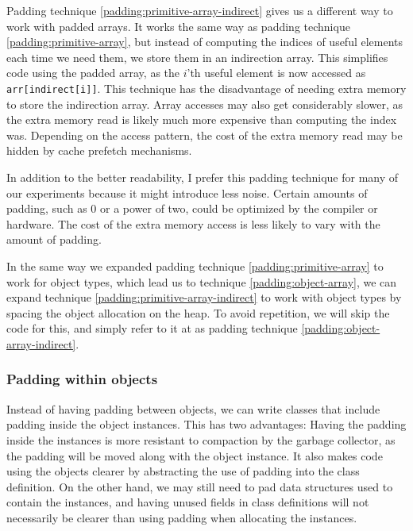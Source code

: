 Padding technique \ref{padding:primitive-array-indirect} gives us a different way to
work with padded arrays. It works the same way as padding technique
\ref{padding:primitive-array}, but instead of computing the indices of
useful elements each time we need them, we store them in an indirection array.
This simplifies code using the padded array, as the $i$'th
useful element is now accessed as \verb|arr[indirect[i]]|. This technique has the
disadvantage of needing extra memory to store the indirection array. Array
accesses may also get considerably slower, as the extra memory read is likely
much more expensive than computing the index was. Depending on the access
pattern, the cost of the extra memory read may be hidden by cache prefetch
mechanisms.

In addition to the better readability, I prefer this padding technique for many
of our experiments because it might introduce less noise. Certain amounts of
padding, such as 0 or a power of two, could be optimized by the compiler or
hardware. The cost of the extra memory access is less likely to vary with the
amount of padding.

In the same way we expanded padding technique \ref{padding:primitive-array} to
work for object types, which lead us to technique \ref{padding:object-array}, we
can expand technique \ref{padding:primitive-array-indirect} to work with object
types by spacing the object allocation on the heap.
\label{padding:object-array-indirect}
To avoid repetition, we will skip the code for this, and simply refer to it at
as padding technique \ref{padding:object-array-indirect}.

\subsubsection{Padding within objects}

Instead of having padding between objects, we can write classes that include
padding inside the object instances. This has two advantages: Having the
padding inside the instances is more resistant to compaction by the garbage
collector, as the padding will be moved along with the object instance. It also
makes code using the objects clearer by abstracting the use of padding into the
class definition. On the other hand, we may still need to pad data structures
used to contain the instances, and having unused fields in class definitions
will not necessarily be clearer than using padding when allocating the
instances.

